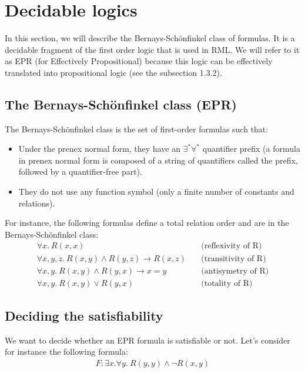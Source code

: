 \documentclass[11pt,a4paper,oldfontcommands,openany]{memoir}
\begin{document}
    \section{Decidable logics}

    In this section, we will describe the Bernays-Schönfinkel class of formulas. It is a decidable fragment of the first order logic that is used in RML.
    We will refer to it as EPR (for Effectively Propositional) because this logic can be effectively translated into propositional logic (see the subsection 1.3.2).

        \subsection{The Bernays-Schönfinkel class (EPR)}

        The Bernays-Schönfinkel class is the set of first-order formulas such that:
        \begin{itemize}
            \item Under the prenex normal form, they have an \(\exists^*\forall^*\) quantifier prefix
            (a formula in prenex normal form is composed of a string of quantifiers called the prefix, followed by a quantifier-free part).
            \item They do not use any function symbol (only a finite number of constants and relations).
        \end{itemize}

        For instance, the following formulas define a total relation order and are in the Bernays-Schönfinkel class:
        \begin{align*}
            \forall x. \ R(x,x) &\quad\text{(reflexivity of R)}\\
            \forall x,y,z. \ R(x,y) \land R(y,z) \rightarrow R(x,z) &\quad\text{(transitivity of R)}\\
            \forall x,y. \ R(x,y) \land R(y,x) \rightarrow x=y &\quad\text{(antisymetry of R)}\\
            \forall x,y. \ R(x,y) \lor R(y,x) &\quad\text{(totality of R)}
        \end{align*}

        \subsection{Deciding the satisfiability}

        We want to decide whether an EPR formula is satisfiable or not. Let's consider for instance the following formula:
        \begin{align*}
            F: \exists x. \forall y. \ R(y,y) \land \neg R(x,y)
        \end{align*}
\end{document}
